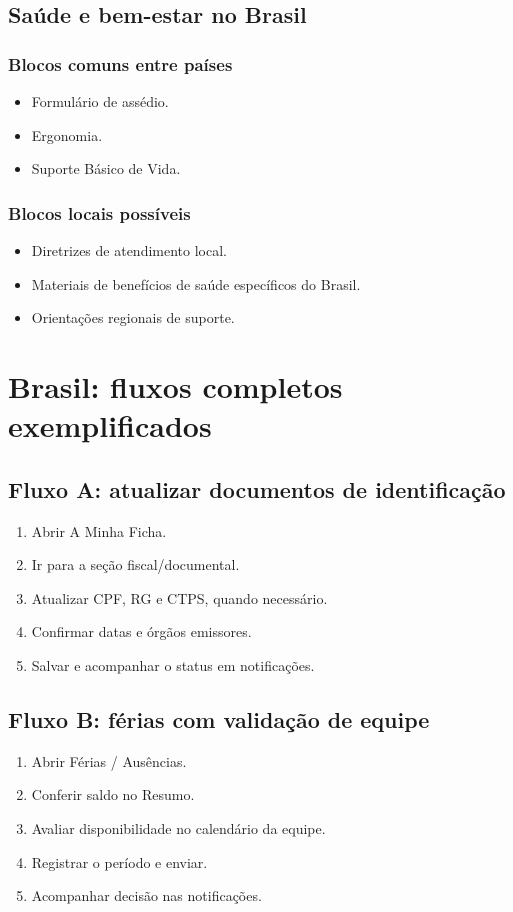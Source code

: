 \section{Saúde e bem-estar no Brasil}
\subsection{Blocos comuns entre países}
\begin{itemize}
  \item Formulário de assédio.
  \item Ergonomia.
  \item Suporte Básico de Vida.
\end{itemize}

\subsection{Blocos locais possíveis}
\begin{itemize}
  \item Diretrizes de atendimento local.
  \item Materiais de benefícios de saúde específicos do Brasil.
  \item Orientações regionais de suporte.
\end{itemize}

\chapter{Brasil: fluxos completos exemplificados}
\section{Fluxo A: atualizar documentos de identificação}
\begin{enumerate}
  \item Abrir A Minha Ficha.
  \item Ir para a seção fiscal/documental.
  \item Atualizar CPF, RG e CTPS, quando necessário.
  \item Confirmar datas e órgãos emissores.
  \item Salvar e acompanhar o status em notificações.
\end{enumerate}

\section{Fluxo B: férias com validação de equipe}
\begin{enumerate}
  \item Abrir Férias / Ausências.
  \item Conferir saldo no Resumo.
  \item Avaliar disponibilidade no calendário da equipe.
  \item Registrar o período e enviar.
  \item Acompanhar decisão nas notificações.
\end{enumerate}

